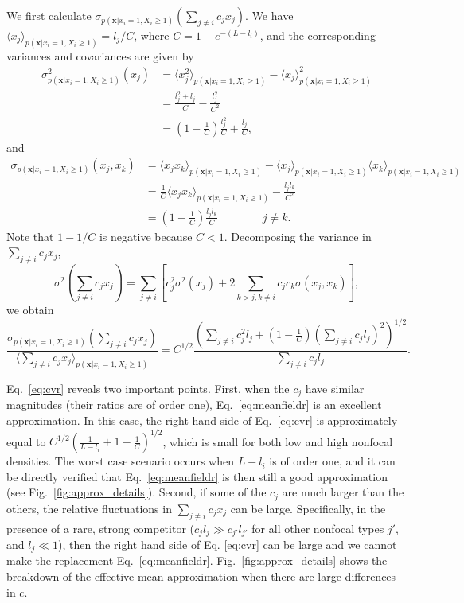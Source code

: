 \documentclass[12pt]{article}
\begin{document}
We first calculate $\sigma_{p({\mathbf x}|x_i=1,X_i\geq 1)}(\sum_{j\neq i} c_j x_j)$. We have $\langle x_j \rangle_{p({\mathbf x}|x_i=1,X_i\geq 1)}=l_j/C$, where $C=1-e^{-(L-l_i)}$, and the corresponding variances and covariances are given by
\begin{align}
\sigma_{p({\mathbf x}|x_i=1,X_i\geq 1)}^2(x_j)&=\langle x_j^2 \rangle_{p({\mathbf x}|x_i=1,X_i\geq 1)}-\langle x_j \rangle_{p({\mathbf x}|x_i=1,X_i\geq 1)}^2\nonumber\\
&=\frac{l_j^2 + l_j}{C}-\frac{l_j^2}{C^2}\nonumber \\
&=\left(1-\frac{1}{C}\right)\frac{l_j^2}{C}+\frac{l_j}{C},\label{eq:varr}
\end{align}
and
\begin{align}
\sigma_{p({\mathbf x}|x_i=1,X_i\geq 1)}(x_j,x_k)&=\langle x_j x_k \rangle_{p({\mathbf x}|x_i=1,X_i\geq 1)}-\langle x_j \rangle_{p({\mathbf x}|x_i=1,X_i\geq 1)}\langle x_k \rangle_{p({\mathbf x}|x_i=1,X_i\geq 1)}\nonumber\\
&=\frac{1}{C}\langle x_j x_k \rangle_{p({\mathbf x}|x_i=1,X_i\geq 1)}-\frac{l_jl_k}{C^2}\nonumber\\
&=\left(1-\frac{1}{C}\right)\frac{l_j l_k}{C}\qquad\qquad j\neq k. \label{eq:covr}
\end{align} 
Note that $1-1/C$ is negative because $C<1$. Decomposing the variance in $\sum_{j\neq i} c_j x_j$,
\begin{equation}
\sigma^2(\sum_{j\neq i} c_j x_j)=\sum_{j\neq i}\left[c_j^2\sigma^2(x_j)+2\sum_{k>j, k\neq i}c_j c_k\sigma(x_j,x_k)\right],\label{eq:vartotr}
\end{equation}
we obtain 
\begin{equation}
\frac{\sigma_{p({\mathbf x}|x_i=1,X_i\geq 1)}(\sum_{j\neq i} c_j x_j)}{\langle\sum_{j\neq i} c_j x_j\rangle_{p({\mathbf x}|x_i=1,X_i\geq 1)}}=C^{1/2}\frac{\left(\sum_{j\neq i}c_j^2 l_j+(1-\frac{1}{C})\left(\sum_{j\neq i}c_j l_j\right)^2 \right)^{1/2}}{\sum_{j\neq i}c_j l_j}. \label{eq:cvr}
\end{equation}

Eq.~\eqref{eq:cvr} reveals two important points. First, when the $c_j$ have similar magnitudes (their ratios are of order one), Eq.~\eqref{eq:meanfieldr} is an excellent approximation. In this case, the right hand side of Eq.~\eqref{eq:cvr} is approximately equal to $C^{1/2}\left(\frac{1}{L-l_i}+1-\frac{1}{C}\right)^{1/2}$, which is small for both low and high nonfocal densities. The worst case scenario occurs when $L-l_i$ is of order one, and it can be directly verified that Eq.~\eqref{eq:meanfieldr} is then still a good approximation (see Fig.~\ref{fig:approx_details}). Second, if some of the $c_j$ are much larger than the others, the relative fluctuations in $\sum_{j\neq i} c_j x_j$ can be large. Specifically, in the presence of a rare,  strong competitor ($c_j l_j\gg c_{j'} l_{j'}$ for all other nonfocal types $j'$, and $l_j\ll 1$), then the right hand side of Eq. \eqref{eq:cvr} can be large and we cannot make the replacement Eq.~\eqref{eq:meanfieldr}. Fig.~\ref{fig:approx_details} shows the breakdown of the effective mean approximation when there are large differences in $c$. 
\end{document}
